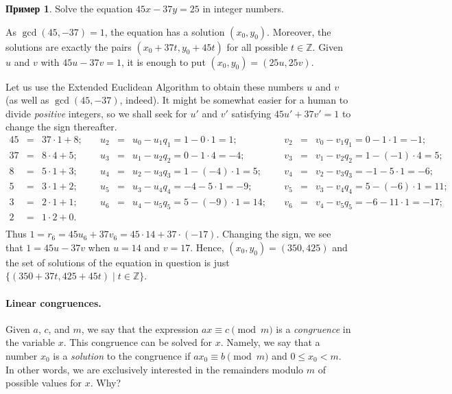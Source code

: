 \documentclass[12pt,notitlepage]{article}
\theoremstyle{plain}
\theoremstyle{definition}
\newtheorem{exm}[thm]{Пример}
\theoremstyle{plain}
\newcommand{\Z}{\mathbb{Z}}
\newcommand{\1}{\mathbf{1}}
\newcommand{\0}{\mathbf{0}}
\begin{document}
\begin{exm}
	Solve the equation $45x - 37y = 25$ in integer numbers.
	
	As $\gcd(45, -37) = 1$, the equation has a solution $(x_0, y_0)$. Moreover, the solutions are exactly the pairs $(x_0 + 37t, y_0 + 45t)$ for all possible $t \in \Z$. Given $u$ and $v$ with $45 u - 37 v = 1$, it is enough to put $(x_0, y_0) = (25 u, 25 v)$.
	
	Let us use the Extended Euclidean Algorithm to obtain these numbers $u$ and $v$ (as well as $\gcd(45,-37)$, indeed). It might be somewhat easier for a human to divide \emph{positive} integers, so we shall seek for $u'$ and $v'$ satisfying $45 u' + 37 v' = 1$ to change the sign thereafter.
	$$
	\begin{array}{lcllcllcl}
		45 &=& 37\cdot1 + 8;\quad& u_2 &=& u_0 - u_1 q_1 = 1 - 0\cdot 1 = 1;&\quad v_2 &=& v_0 - v_1 q_1 = 0 - 1\cdot  1 = -1;\\
		37 &=& 8\cdot 4 + 5;\quad& u_3 &=& u_1 - u_2 q_2 = 0 - 1\cdot 4 = -4;&\quad v_3 &=& v_1 - v_2 q_2 = 1 - (-1)\cdot  4 = 5;\\
		8 &=& 5\cdot 1 + 3;\quad& u_4 &=& u_2 - u_3 q_3 = 1 - (-4)\cdot 1 = 5;&\quad v_4 &=& v_2 - v_3 q_3 = -1 - 5\cdot  1 = -6;\\
		5 &=& 3\cdot 1 + 2;\quad& u_5 &=& u_3 - u_4 q_4 = -4 - 5\cdot 1 = -9;&\quad v_5 &=& v_3 - v_4 q_4 = 5 - (-6)\cdot  1 = 11;\\
		3 &=& 2\cdot 1 + 1;\quad& u_6 &=& u_4 - u_5 q_5 = 5 - (-9)\cdot 1 = 14;&\quad v_6 &=& v_4 - v_5 q_5 = -6 - 11\cdot  1 = -17;\\
		2 &=& 1\cdot 2 + 0.&&&&&&\\
	\end{array}
	$$
	Thus $1 = r_6 = 45 u_6 + 37 v_6 = 45 \cdot 14 + 37 \cdot (-17)$. Changing the sign, we see that $1 = 45 u - 37 v$ when $u = 14$ and $v = 17$. Hence, $(x_0, y_0) = (350, 425)$ and the set of solutions of the equation in question is just $\{ (350 + 37t, 425 + 45t) \mid t \in \Z \}$.
\end{exm}

\paragraph{Linear congruences.} Given $a$, $c$, and $m$, we say that the expression $a x \equiv c \pmod m$ is a \emph{congruence} in the variable $x$. This congruence can be solved for $x$. Namely, we say that a number $x_0$ is a \emph{solution} to the congruence if $a x_0 \equiv b \pmod m$ and $0 \leq x_0 < m$. In other words, we are exclusively interested in the remainders modulo $m$ of possible values for $x$. Why?
\end{document}
